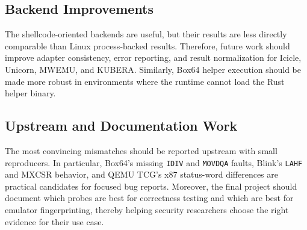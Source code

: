 \subsection{Backend Improvements}

The shellcode-oriented backends are useful, but their results are less directly comparable than Linux process-backed results. Therefore, future work should improve adapter consistency, error reporting, and result normalization for Icicle, Unicorn, MWEMU, and KUBERA. Similarly, Box64 helper execution should be made more robust in environments where the runtime cannot load the Rust helper binary.

\subsection{Upstream and Documentation Work}

The most convincing mismatches should be reported upstream with small reproducers. In particular, Box64's missing \texttt{IDIV} and \texttt{MOVDQA} faults, Blink's \texttt{LAHF} and MXCSR behavior, and QEMU TCG's x87 status-word differences are practical candidates for focused bug reports. Moreover, the final project should document which probes are best for correctness testing and which are best for emulator fingerprinting, thereby helping security researchers choose the right evidence for their use case.
